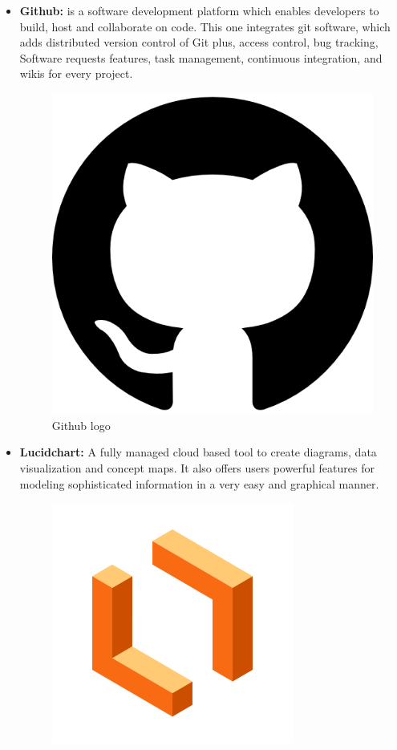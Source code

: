 \begin{itemize}
\begin{figure}[H]
        \end{figure}
    \item \textbf{Github:} is a software development platform which enables developers to 
    build, host and collaborate on code. This one integrates git software, which adds distributed 
    version control of Git plus, access control, bug tracking, Software requests features, task management, continuous integration, and wikis for every project.
        \begin{figure}[H] 
            \centering
            \includegraphics[scale=0.15]{logos/github-logo.png}
            \caption{Github logo } 
            \label{fig: Github logo}
        \end{figure}
    \item \textbf{Lucidchart:} A fully managed cloud based tool to create diagrams, data visualization and concept maps. It also offers users powerful features for modeling sophisticated information in a very easy and graphical manner.
        \begin{figure}[H] 
            \centering
            \includegraphics[scale=0.2]{logos/lucichart-logo.png}

\end{figure}
\end{itemize}
